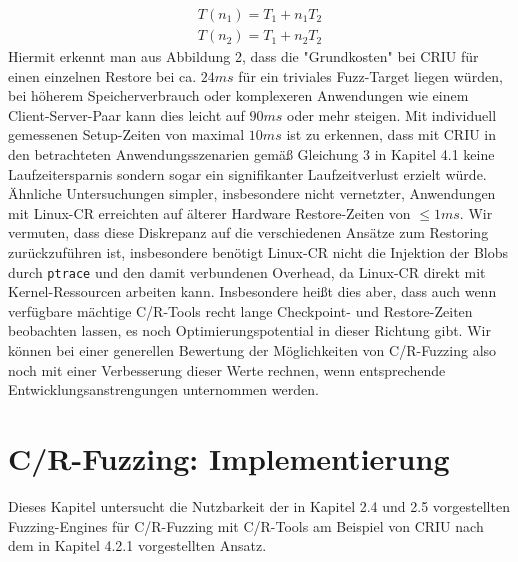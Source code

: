 \documentclass[a4paper]{article}
\begin{document}
\begin{equation}
    \begin{split}
    T(n_1) = T_1 + n_1 T_2 \\
    T(n_2) = T_1 + n_2 T_2
    \end{split}
\end{equation}
Hiermit erkennt man aus Abbildung 2, dass die "Grundkosten" bei CRIU für einen einzelnen Restore bei ca. $24ms$ für ein triviales Fuzz-Target liegen würden, bei höherem Speicherverbrauch oder komplexeren Anwendungen wie einem Client-Server-Paar kann dies leicht auf $90ms$ oder mehr steigen. 
Mit individuell gemessenen Setup-Zeiten von maximal $10{ms}$ ist zu erkennen, dass mit CRIU in den betrachteten Anwendungsszenarien gemäß Gleichung 3 in Kapitel 4.1 keine Laufzeitersparnis sondern sogar ein signifikanter Laufzeitverlust erzielt würde.\\
Ähnliche Untersuchungen simpler, insbesondere nicht vernetzter, Anwendungen mit Linux-CR\cite{linuxcr} erreichten auf älterer Hardware Restore-Zeiten von $\leq 1{ms}$. 
Wir vermuten, dass diese Diskrepanz auf die verschiedenen Ansätze zum Restoring zurückzuführen ist, insbesondere benötigt Linux-CR nicht die Injektion der Blobs durch \texttt{ptrace} und den damit verbundenen Overhead, da Linux-CR direkt mit Kernel-Ressourcen arbeiten kann. 
Insbesondere heißt dies aber, dass auch wenn verfügbare mächtige C/R-Tools recht lange Checkpoint- und Restore-Zeiten beobachten lassen, es noch Optimierungspotential in dieser Richtung gibt.
Wir können bei einer generellen Bewertung der Möglichkeiten von C/R-Fuzzing also noch mit einer Verbesserung dieser Werte rechnen, wenn entsprechende Entwicklungsanstrengungen unternommen werden.

\section{C/R-Fuzzing: Implementierung}
Dieses Kapitel untersucht die Nutzbarkeit der in Kapitel 2.4 und 2.5 vorgestellten Fuzzing-Engines für C/R-Fuzzing mit C/R-Tools am Beispiel von CRIU nach dem in Kapitel 4.2.1 vorgestellten Ansatz.
\end{document}
